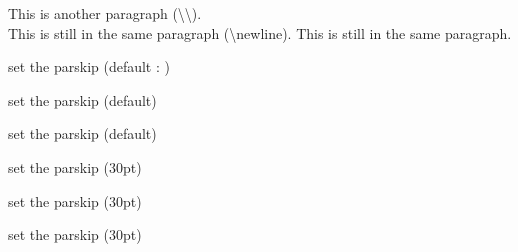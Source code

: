             \mbox{}

            This is another paragraph (\textbackslash \textbackslash).\\ %
            This is still in the same paragraph (\textbackslash newline).\newline %
            This is still in the same paragraph.
            
            \setlength{\parskip}{0pt plus 1pt} %

            set the parskip (default : \the\parskip)

            set the parskip (default)

            set the parskip (default)

            {\setlength{\parskip}{30pt}
            
            set the parskip (30pt)

            set the parskip (30pt)

            set the parskip (30pt)
            }

